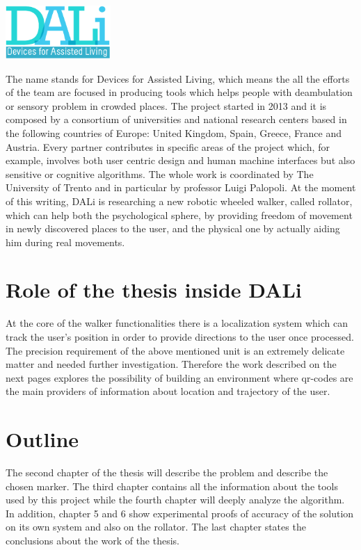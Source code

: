 \vspace{1cm}
\begin{center}
      \includegraphics[width=0.3\textwidth]{img/Dali-logo.png}
\end{center}
\vspace{1cm}

The name stands for Devices for Assisted Living, which means the all the efforts of the team are focused in producing tools which helps people with deambulation or sensory problem in crowded places.
The project started in 2013 and it is composed by a consortium of universities and national research centers based in the following countries of Europe: United Kingdom, Spain, Greece, France and Austria.
Every partner contributes in specific areas of the project which, for example, involves both user centric design and human machine interfaces but also sensitive or cognitive algorithms.
The whole work is coordinated by The University of Trento and in particular by professor Luigi Palopoli.
At the moment of this writing, DALi is researching a new robotic wheeled walker, called rollator, which can help both the psychological sphere, by providing freedom of movement in newly discovered places to the user, and the physical one by actually aiding him during real movements.


\section{Role of the thesis inside DALi}
At the core of the walker functionalities there is a localization system which can track the user's position in order to provide directions to the user once processed.
The precision requirement of the above mentioned unit is an extremely delicate matter and needed further investigation.
Therefore the work described on the next pages explores the possibility of building an environment where qr-codes are the main providers of information about location and trajectory of the user.



\section{Outline}
The second chapter of the thesis will describe the problem and describe the chosen marker.
The third chapter contains all the information about the tools used by this project while
the fourth chapter will deeply analyze the algorithm.
In addition, chapter 5 and 6 show experimental proofs of accuracy of the solution on its own system and also on the rollator.
The last chapter states the conclusions about the work of the thesis.






  
